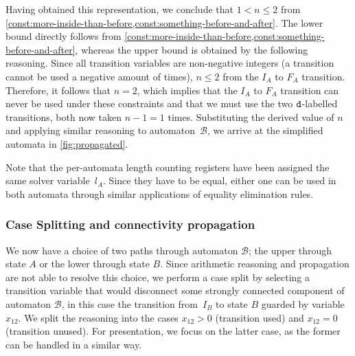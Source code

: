 Having obtained this representation, we conclude that $1 < n \leq 2$
from
\cref{const:more-inside-than-before,const:something-before-and-after}. The
lower bound directly follows from
\cref{const:more-inside-than-before,const:something-before-and-after},
whereas the upper bound is obtained by the following reasoning. Since all
transition variables are non-negative integers (a transition cannot be
used a negative amount of times), $n \leq 2$ from the $I_A$ to $F_A$
transition. Therefore, it follows that $n=2$, which implies that the
$I_A$ to $F_A$ transition can never be used under these constraints
and that we must use the two $\texttt{d}$-labelled transitions, both now
taken $n-1 =1$ times.
%
Substituting the derived value of $n$ and applying similar
reasoning to automaton~$\mathcal{B}$, we arrive at the simplified
automata in \cref{fig:propagated}.


Note that the per-automata length counting registers have been assigned the same
solver variable~$l_A$. Since they have to be equal, either one can be used in
both automata through similar applications of equality elimination rules.


\subsubsection{Case Splitting and connectivity propagation}\label{sec:intuition:split}
We now have a choice of two paths through automaton $\mathcal{B}$; the
upper through state $A$ or the lower through state $B$. Since
arithmetic reasoning and propagation are not able to resolve this choice,
we perform a case split by selecting a transition variable that would disconnect
some strongly connected component of automaton $\mathcal{B}$, in this case the transition
from~$I_B$ to state $B$ guarded by variable~$x_{12}$.
 We split the reasoning into the cases $x_{12} > 0$ (transition used)
and $x_{12} = 0$ (transition unused). For presentation, we focus
on the latter case, as the former can be handled in a similar way.

